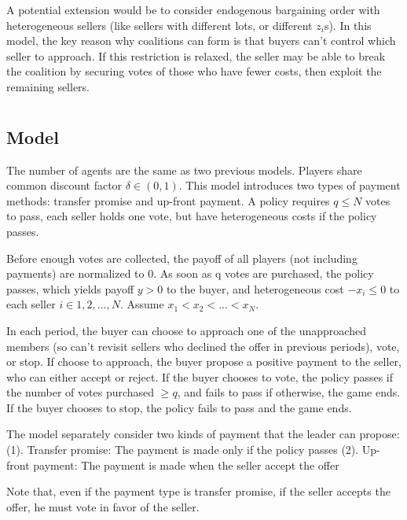 \documentclass[ProjectGAZ]{subfiles}
\begin{document}
A potential extension would be to consider endogenous bargaining order with heterogeneous sellers (like sellers with different lots, or different $z_i$s). In this model, the key reason why coalitions can form is that buyers can't control which seller to approach. If this restriction is relaxed, the seller may be able to break the coalition by securing votes of those who have fewer costs, then exploit the remaining sellers.


\section{\cite{CnZSeqVB}}\label{subsec:CnZ}

\subsection{Model}\label{subsec:CnZ-model}

The number of agents are the same as two previous models. Players share common discount factor $\delta \in (0, 1)$. This model introduces two types of payment methods: transfer promise and up-front payment. A policy requires $q \leq N$ votes to pass, each seller holds one vote, but have heterogeneous costs if the policy passes.

Before enough votes are collected, the payoff of all players (not including payments) are normalized to 0. As soon as q votes are purchased, the policy passes, which yields payoff $y > 0$ to the buyer, and heterogeneous cost $-x_i \leq 0$ to each seller $i \in {1, 2, ..., N}$. Assume $x_1 < x_2 < ... <x_N$.
 
In each period, the buyer can choose to approach one of the unapproached members (so can't revisit sellers who declined the offer in previous periods), vote, or stop. If choose to approach, the buyer propose a positive payment to the seller, who can either accept or reject. If the buyer chooses to vote, the policy passes if the number of votes purchased $\geq q$, and fails to pass if otherwise, the game ends. If the buyer chooses to stop, the policy fails to pass and the game ends.

The model separately consider two kinds of payment that the leader can propose:
(1). Transfer promise: The payment is made only if the policy passes
(2). Up-front payment: The payment is made when the seller accept the offer

Note that, even if the payment type is transfer promise, if the seller accepts the offer, he must vote in favor of the seller. 
\end{document}
